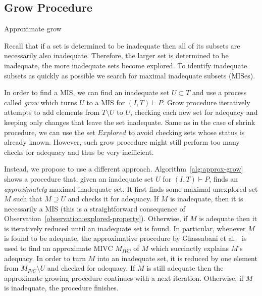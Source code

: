  



\subsection{Grow Procedure}

%
%
 
\begin{algorithm}[!t]
\label{alg:approx-grow}

\caption{Approximate grow}
\end{algorithm}

Recall that if a set is determined to be inadequate then all of its subsets are necessarily also inadequate. Therefore, the larger set is determined to be inadequate, the more inadequate sets become explored.  %
To identify inadequate subsets as quickly as possible we search for maximal inadequate subsets (MISes).  

In order to find a MIS, we can find an inadequate set $U \subset T$ and use a process called \emph{grow} which turns $U$ to a MIS for $(I,T) \vdash P$.
Grow procedure iteratively attempts to add elements from $T \setminus U$ to $U$, checking each new set for adequacy and keeping only changes that leave the set inadequate. Same as in the case of shrink procedure, we can use the set $Explored$ to avoid checking sets whose status is already known.
However, such grow procedure might still perform too many checks for adequacy and thus be very inefficient. 


Instead, we propose to use a different approach. Algorithm~\ref{alg:approx-grow} shows a procedure that, given an inadequate set $U$ for $(I, T) \vdash P$, finds an \emph{approximately} maximal inadequate set. 
It first finds some maximal unexplored set $M$ such that $M \supseteq U$ and checks it for adequacy. 
If $M$ is inadequate, then it is necessarily a MIS
(this is a straightforward consequence of Observation~\ref{observation:explored-property}). 
Otherwise, if $M$ is adequate then it is iteratively reduced until an inadequate set is found.
In particular, whenever $M$ is found to be adequate, the approximative procedure by Ghassabani et al.~\cite{single-mivc} is used to find an approximate MIVC $M_{IVC}$ of $M$ which succinctly explains $M$'s adequacy. In order to turn $M$ into an inadequate set, it is reduced by one element from $M_{IVC} \setminus U$ and checked for adequacy. If $M$ is still adequate then the approximate growing procedure continues with a next iteration. Otherwise, if $M$ is inadequate, the procedure finishes.

